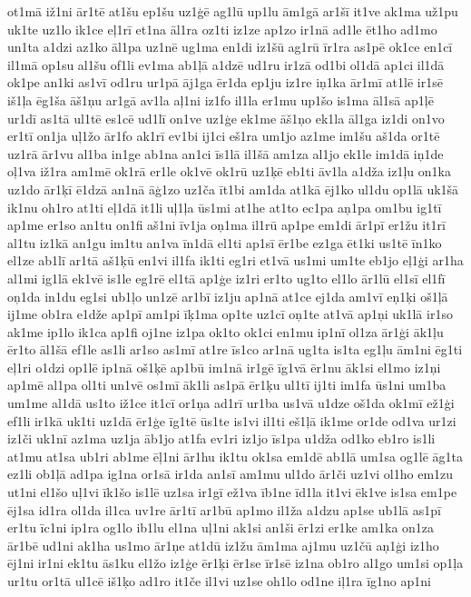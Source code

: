 {ot1mā
iž1ni
ār1tē
at1šu
ep1šu
uz1ģē
ag1lū
up1lu
ām1gā
ar1šī
it1ve
ak1ma
už1pu
uk1te
uz1lo
ik1ce
eļ1rī
et1na
āl1ra
oz1ti
iz1ze
ap1zo
ir1nā
ad1le
ēt1ho
ad1mo
un1ta
a1dzi
az1ko
āl1pa
uz1nē
ug1ma
en1di
iz1šū
ag1rū
īr1ra
as1pē
ok1ce
en1cī
il1mā
op1su
al1šu
of1li
ev1ma
ab1ļā
a1dzē
ud1ru
ir1zā
od1bi
ol1dā
ap1ci
il1dā
ok1pe
an1ki
as1vī
od1ru
ur1pā
āj1ga
ēr1da
ep1ju
iz1re
iņ1ka
ār1mī
at1lē
ir1sē
iš1ļa
ēg1ša
āš1ņu
ar1gā
av1la
aļ1ni
iz1fo
il1la
er1mu
up1šo
is1ma
āl1sā
ap1ļē
ur1dī
as1tā
ul1tē
es1cē
ud1lī
on1ve
uz1ģe
ek1me
āš1ņo
ek1la
āl1ga
iz1di
on1vo
er1tī
on1ja
uļ1žo
ār1fo
ak1rī
ev1bi
ij1ci
eš1ra
um1jo
az1me
im1šu
aš1da
or1tē
uz1rā
ār1vu
al1ba
in1ge
ab1na
an1ci
īs1lā
il1šā
am1za
al1jo
ek1le
im1dā
iņ1de
oļ1va
iž1ra
am1mē
ok1rā
er1le
ok1vē
ok1rū
uz1ķē
eb1ti
āv1la
a1dža
iz1ļu
on1ka
uz1do
ār1ķī
ē1dzā
an1nā
āģ1zo
uz1ča
īt1bi
am1da
at1kā
ēj1ko
ul1du
op1lā
uk1šā
ik1nu
oh1ro
at1ti
eļ1dā
it1li
uļ1ļa
ūs1mi
at1he
at1to
ec1pa
aņ1pa
om1bu
ig1tī
ap1me
er1so
an1tu
on1fi
aš1ni
īv1ja
oņ1ma
il1rū
ap1pe
em1di
ār1pī
er1žu
it1rī
al1tu
iz1kā
an1gu
im1tu
an1va
īn1dā
el1ti
ap1sī
ēr1be
ez1ga
ēt1ki
us1tē
īn1ko
el1ze
ab1lī
ar1tā
aš1ķū
en1vi
il1fa
ik1ti
eg1ri
et1vā
us1mi
um1te
eb1jo
eļ1ģi
ar1ha
al1mi
ig1lā
ek1vē
is1le
eg1rē
el1tā
ap1ģe
iz1ri
er1to
ug1to
el1lo
ār1lū
el1sī
el1fī
oņ1da
in1du
eg1si
ub1ļo
un1zē
ar1bī
iz1ju
ap1nā
at1ce
ej1da
am1vī
eņ1ķi
oš1ļā
ij1me
ob1ra
e1dže
ap1pī
am1pi
īķ1ma
op1te
uz1cī
oņ1te
at1vā
ap1ņi
uk1lā
ir1so
ak1me
ip1lo
ik1ca
ap1fi
oj1ne
iz1pa
ok1to
ok1ci
en1mu
ip1nī
ol1za
ār1ģi
āk1ļu
ēr1to
āl1šā
ef1le
as1li
ar1so
as1mī
at1re
īs1co
ar1nā
ug1ta
is1ta
eg1ļu
ām1ni
ēg1ti
eļ1ri
o1dzi
op1lē
ip1nā
oš1ķē
ap1bū
im1nā
ir1gē
īg1vā
ēr1nu
āk1si
el1mo
iz1ņi
ap1mē
al1pa
ol1ti
un1vē
os1mī
āk1li
as1pā
ēr1ķu
ul1tī
ij1ti
im1fa
ūs1ni
um1ba
um1me
al1dā
us1to
iž1ce
it1cī
or1ņa
ad1rī
ur1ba
us1vā
u1dze
oš1da
ok1mī
ež1ģi
ef1li
ir1kā
uk1ti
uz1dā
ēr1ģe
īg1tē
ūs1te
is1vi
il1ti
eš1ļā
ik1me
or1de
od1va
ur1zi
iz1či
uk1nī
az1ma
uz1ja
āb1jo
at1fa
ev1ri
iz1jo
īs1pa
u1dža
od1ko
eb1ro
is1li
at1mu
at1sa
ub1ri
ab1me
ēļ1ni
ār1hu
ik1tu
ok1sa
em1dē
ab1lā
um1sa
og1lē
āg1ta
ez1li
ob1ļā
ad1pa
ig1na
or1sā
ir1da
an1sī
am1mu
ul1do
ār1či
uz1vi
ol1ho
em1zu
ut1ni
el1šo
uļ1vi
īk1šo
is1lē
uz1sa
ir1gī
ež1va
īb1ne
īd1la
it1vi
ēk1ve
is1sa
em1pe
ēj1sa
id1ra
ol1da
il1ca
uv1re
ār1tī
ar1bū
ap1mo
il1ža
a1dzu
ap1se
ub1lā
as1pī
er1tu
īc1ni
ip1ra
og1lo
ib1lu
el1na
uļ1ni
ak1si
an1ši
ēr1zi
er1ke
am1ka
on1za
ār1bē
ud1ni
ak1ha
us1mo
ār1ņe
at1dū
iz1žu
ām1ma
aj1mu
uz1čū
aņ1ģi
iz1ho
ēj1ni
ir1ni
ek1tu
ās1ku
el1žo
iz1ģe
ēr1ķi
ēr1se
īr1sē
iz1na
ob1ro
al1go
um1si
op1ļa
ur1tu
or1tā
ul1cē
iš1ķo
ad1ro
it1če
il1vi
uz1se
oh1lo
od1ne
iļ1ra
īg1no
ap1ni
}
